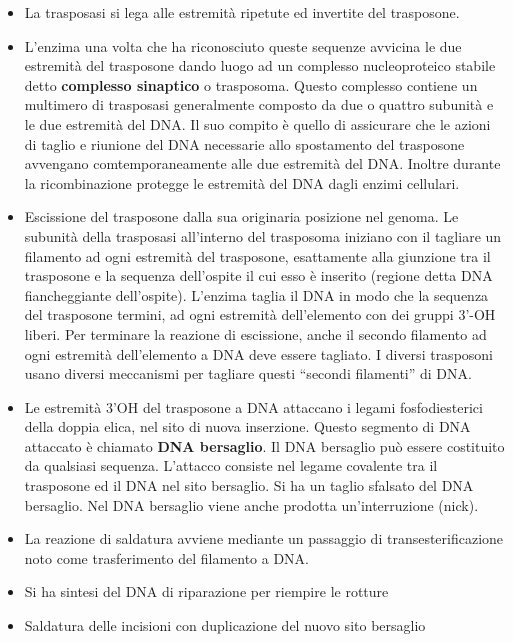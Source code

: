 \documentclass[11pt]{book}
\begin{document}
\begin{itemize}
\itemsep1pt\parskip0pt
\item
  La trasposasi si lega alle estremità ripetute ed invertite del
  trasposone.
\item
  L'enzima una volta che ha riconosciuto queste sequenze avvicina le
  due estremità del trasposone dando luogo ad un complesso
  nucleoproteico stabile detto \textbf{complesso sinaptico} o
  trasposoma. Questo complesso contiene un multimero di trasposasi
  generalmente composto da due o quattro subunità e le due estremità
  del DNA. Il suo compito è quello di assicurare che le azioni di
  taglio e riunione del DNA necessarie allo spostamento del trasposone
  avvengano comtemporaneamente alle due estremità del DNA. Inoltre
  durante la ricombinazione protegge le estremità del DNA dagli enzimi
  cellulari.
\item
  Escissione del trasposone dalla sua originaria posizione nel genoma.
  Le subunità della trasposasi all'interno del trasposoma iniziano con
  il tagliare un filamento ad ogni estremità del trasposone,
  esattamente alla giunzione tra il trasposone e la sequenza
  dell'ospite il cui esso è inserito (regione detta DNA fiancheggiante
  dell'ospite). L'enzima taglia il DNA in modo che la sequenza del
  trasposone termini, ad ogni estremità dell'elemento con dei gruppi
  3'-OH liberi. Per terminare la reazione di escissione, anche il
  secondo filamento ad ogni estremità dell'elemento a DNA deve essere
  tagliato. I diversi trasposoni usano diversi meccanismi per tagliare
  questi ``secondi filamenti'' di DNA.
\item
  Le estremità 3'OH del trasposone a DNA attaccano i legami
  fosfodiesterici della doppia elica, nel sito di nuova inserzione.
  Questo segmento di DNA attaccato è chiamato \textbf{DNA bersaglio}.
  Il DNA bersaglio può essere costituito da qualsiasi sequenza.
  L'attacco consiste nel legame covalente tra il trasposone ed il DNA
  nel sito bersaglio. Si ha un taglio sfalsato del DNA bersaglio. Nel
  DNA bersaglio viene anche prodotta un'interruzione (nick).
\item
  La reazione di saldatura avviene mediante un passaggio di
  transesterificazione noto come trasferimento del filamento a DNA.
\item
  Si ha sintesi del DNA di riparazione per riempire le rotture
\item
  Saldatura delle incisioni con duplicazione del nuovo sito bersaglio
  \end{itemize}
\end{document}
